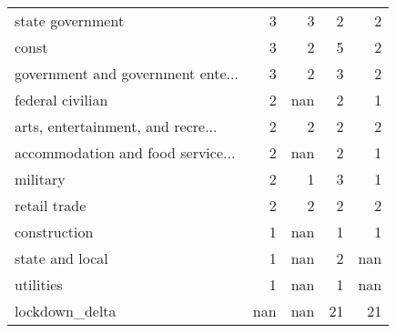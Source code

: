 \begin{tabular}{lrrrr}
 state government                  &                      3 &                     3 &                      2 &                     2 \\
 const                             &                      3 &                     2 &                      5 &                     2 \\
 government and government ente... &                      3 &                     2 &                      3 &                     2 \\
 federal civilian                  &                      2 &                   nan &                      2 &                     1 \\
 arts, entertainment, and recre... &                      2 &                     2 &                      2 &                     2 \\
 accommodation and food service... &                      2 &                   nan &                      2 &                     1 \\
 military                          &                      2 &                     1 &                      3 &                     1 \\
 retail trade                      &                      2 &                     2 &                      2 &                     2 \\
 construction                      &                      1 &                   nan &                      1 &                     1 \\
 state and local                   &                      1 &                   nan &                      2 &                   nan \\
 utilities                         &                      1 &                   nan &                      1 &                   nan \\
 lockdown\_delta                    &                    nan &                   nan &                     21 &                    21 \\
\hline
\end{tabular}